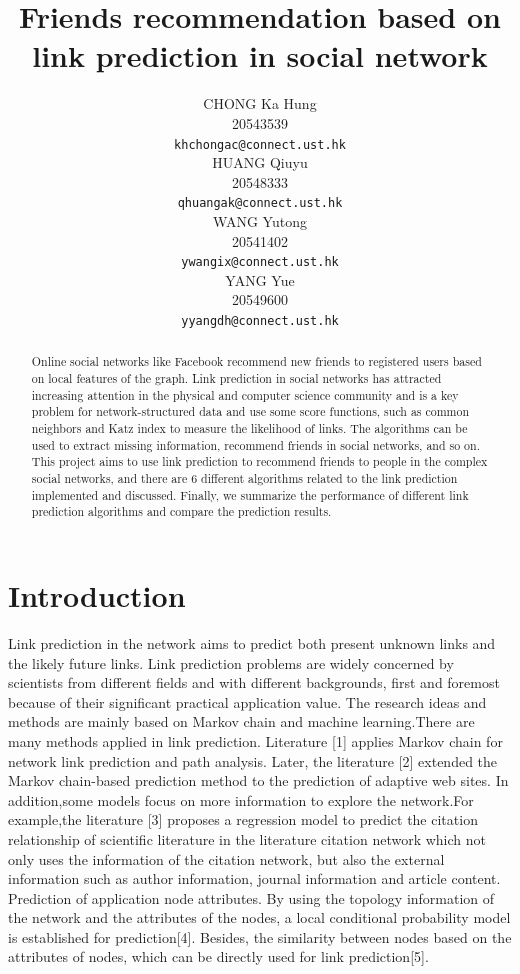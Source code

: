 \documentclass{article}
\title{Friends recommendation based on link prediction in social network}
\author{%
  	CHONG Ka Hung\\
  	20543539\\
	\texttt{khchongac@connect.ust.hk} \\
	\And
	HUANG Qiuyu\\
	20548333\\
	\texttt{qhuangak@connect.ust.hk}\\
	\AND
	WANG Yutong\\
	20541402\\
	\texttt{ywangix@connect.ust.hk}\\
	\And
	YANG Yue\\
	20549600\\
	\texttt{yyangdh@connect.ust.hk}\\
}
\begin{document}
\maketitle

\begin{abstract}
Online social networks like Facebook recommend new friends to registered users based on local features of the graph. Link prediction in social networks has attracted increasing attention in the physical and computer science community and is a key problem for network-structured data and use some score functions, such as common neighbors and Katz index to measure the likelihood of links. The algorithms can be used to extract missing information, recommend friends in social networks, and so on. This project aims to use link prediction to recommend friends to people in the complex social networks, and there are 6 different algorithms related to the link prediction implemented and discussed. Finally, we summarize the performance of different link prediction algorithms and compare the prediction results. 
\end{abstract}

\section{Introduction}
Link prediction in the network aims to predict both present unknown links and the likely future links. Link prediction problems are widely concerned by scientists from different fields and with different backgrounds, first and foremost because of their significant practical application value. The research ideas and methods are mainly based on Markov chain and machine learning.There are many methods applied in link prediction. Literature [1] applies Markov chain for network link prediction and path analysis. Later, the literature [2] extended the Markov chain-based prediction method to the prediction of adaptive web sites. In addition,some models focus on more information to explore the network.For example,the literature [3] proposes a regression model to predict the citation relationship of scientific literature in the literature citation network which not only uses the information of the citation network, but also the external information such as author information, journal information and article content. Prediction of application node attributes. By using the topology information of the network and the attributes of the nodes, a local conditional probability model is established for prediction[4]. Besides, the similarity between nodes based on the attributes of nodes, which can be directly used for link prediction[5]. \\
\end{document}
